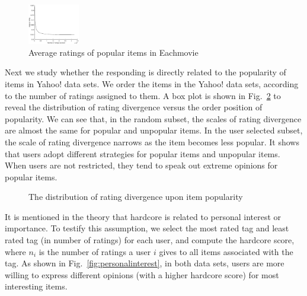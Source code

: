 \documentclass{sig-alternate}
\begin{document}
\begin{figure}[htbp]
\centering
\begin{center}
\includegraphics[width=0.2\textwidth]{fig8_eachmovie_popular.eps}
\caption{{Average ratings of popular items in Eachmovie}}
\label{fig:ratingpopulareachmovie}
\end{center}
\end{figure}

Next we study whether the responding is directly related to the popularity of items in Yahoo! data sets. We order the items in the Yahoo! data sets, according to the number of ratings assigned to them. A box plot is shown in Fig.~\ref{fig:popularity} to reveal the distribution of rating divergence versus the order position of popularity. We can see that, in the random subset, the scales of rating divergence are almost the same for popular and unpopular items. In the user selected subset, the scale of rating divergence narrows as the item becomes less popular. It shows that users adopt different strategies for popular items and unpopular items. When users are  not restricted,  they tend to speak out extreme opinions for popular items.

\begin{figure}[htbp]
\centering
\centering
{}
\caption{The distribution of rating divergence upon item popularity}
\label{fig:popularity}
\end{figure}

It is mentioned in the theory\cite{Neolle-Neumann1993spiral} that hardcore is related to personal interest or importance. To testify this assumption, we select the most rated tag and least rated tag (in number of ratings) for each user, and compute the hardcore score, where $n_i$ is the number of ratings a user $i$ gives to all items associated with the tag.  As shown in Fig.~\ref{fig:personalinterest}, in both data sets, users are more willing to express different opinions (with a higher hardcore score) for most interesting items.
\end{document}
